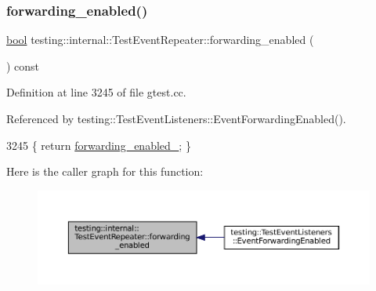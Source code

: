 \subsubsection{\texorpdfstring{forwarding\+\_\+enabled()}{forwarding\_enabled()}}
{\footnotesize\ttfamily \hyperlink{classbool}{bool} testing\+::internal\+::\+Test\+Event\+Repeater\+::forwarding\+\_\+enabled (\begin{DoxyParamCaption}{ }\end{DoxyParamCaption}) const\hspace{0.3cm}{\ttfamily [inline]}}



Definition at line 3245 of file gtest.\+cc.



Referenced by testing\+::\+Test\+Event\+Listeners\+::\+Event\+Forwarding\+Enabled().


\begin{DoxyCode}
3245 \{ \textcolor{keywordflow}{return} \hyperlink{classtesting_1_1internal_1_1TestEventRepeater_a1f7e494642d653eaad800504510d18a3}{forwarding\_enabled\_}; \}
\end{DoxyCode}
Here is the caller graph for this function\+:
\nopagebreak
\begin{figure}[H]
\begin{center}
\leavevmode
\includegraphics[width=350pt]{classtesting_1_1internal_1_1TestEventRepeater_abaf2bfc453fc0e1005fcfb0f95deac4c_icgraph}
\end{center}
\end{figure}
\mbox{\label{classtesting_1_1internal_1_1TestEventRepeater_a882648737e85eff0986ff66b794e310a}} 
